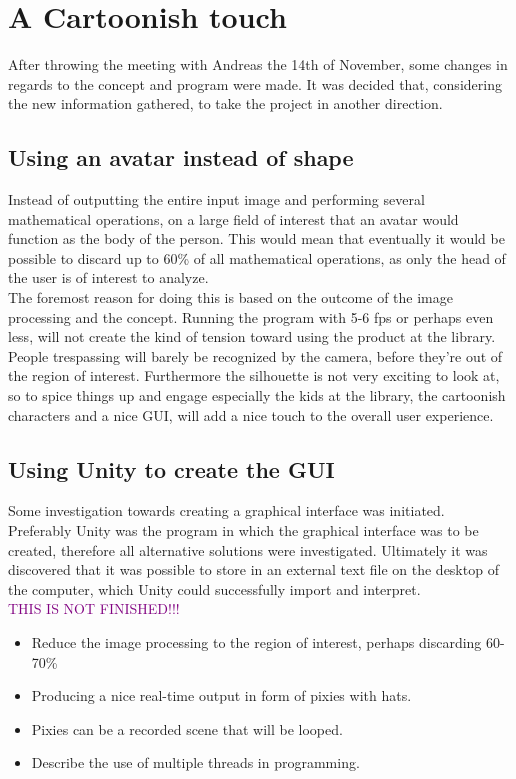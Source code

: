 \section{A Cartoonish touch}
After throwing the meeting with Andreas the 14th of November, some changes in regards to the concept and program were made. It was decided that, considering the new information gathered, to take the project in another direction.

\subsection{Using an avatar instead of shape}
Instead of outputting the entire input image and performing several mathematical operations, on a large field of interest that an avatar would function as the body of the person. This would mean that eventually it would be possible to discard up to 60{\%} of all mathematical operations, as only the head of the user is of interest to analyze.\\
The foremost reason for doing this is based on the outcome of the image processing and the concept. Running the program with 5-6 fps or perhaps even less, will not create the kind of tension toward using the product at the library. People trespassing will barely be recognized by the camera, before they're out of the region of interest. Furthermore the silhouette is not very exciting to look at, so to spice things up and engage especially the kids at the library, the cartoonish characters and a nice GUI, will add a nice touch to the overall user experience. 

\subsection{Using Unity to create the GUI}
Some investigation towards creating a graphical interface was initiated. Preferably Unity was the program in which the graphical interface was to be created, therefore all alternative solutions were investigated. Ultimately it was discovered that it was possible to store in an external text file on the desktop of the computer, which Unity could successfully import and interpret.\\
  


\textcolor{purple}{THIS IS NOT FINISHED!!!}
 \begin{itemize}
\item Reduce the image processing to the region of interest, perhaps discarding 60-70{\%}
\item Producing a nice real-time output in form of pixies with hats.
\item Pixies can be a recorded scene that will be looped.
\item Describe the use of multiple threads in programming.
\end{itemize}
 
